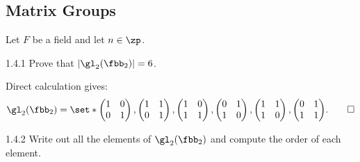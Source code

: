 \subsection{Matrix Groups}

Let $F$ be a field and let $n \in \zp$.

\begin{exercise}{1.4.1}
    Prove that $|\gl_2(\fbb_2)| = 6$.
\end{exercise}

\begin{sol}
    Direct calculation gives:
    \[
        \gl_2(\fbb_2) = 
        \set*{
        \begin{pmatrix}
            1 & 0 \\
            0 & 1
        \end{pmatrix}, 
        \begin{pmatrix}
            1 & 1 \\
            0 & 1
        \end{pmatrix},
        \begin{pmatrix}
            1 & 0 \\
            1 & 1
        \end{pmatrix},
        \begin{pmatrix}
            0 & 1 \\
            1 & 0
        \end{pmatrix},
        \begin{pmatrix}
            1 & 1 \\
            1 & 0
        \end{pmatrix},
        \begin{pmatrix}
            0 & 1 \\
            1 & 1
        \end{pmatrix}}. \qedhere
    \]
\end{sol}

\begin{exercise}{1.4.2}
    Write out all the elements of $\gl_2(\fbb_2)$ and compute the order of each element.
\end{exercise}

